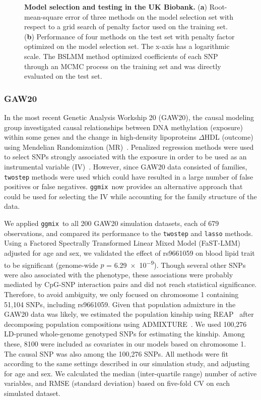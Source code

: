 \documentclass[10pt,letterpaper]{article}
\newcommand{\ggmix}{\texttt{ggmix}}
\begin{document}
\begin{figure}[!h]
	\caption{{\bf Model selection and testing in the UK Biobank.}
	({\bf a}) Root-mean-square error of three methods on the model selection set with respect to a grid search of penalty factor used on the training set. ({\bf b}) Performance of four methods on the test set with penalty factor optimized on the model selection set. The x-axis has a logarithmic scale. The BSLMM method optimized coefficients of each SNP through an MCMC process on the training set and was directly evaluated on the test set.}\label{fig:UKB-Figure}
\end{figure}








\subsubsection*{GAW20}

In the most recent Genetic Analysis Workship 20 (GAW20), the causal modeling group investigated causal relationships between DNA methylation (exposure) within some genes and the change in high-density lipoproteins $\Delta$HDL (outcome) using Mendelian Randomization (MR)~\cite{davey2003mendelian}.
Penalized regression methods were used to select SNPs strongly associated with the exposure in order to be used as an instrumental variable (IV)~\cite{cherlin2018using,zhou2018analysis}.
However, since GAW20 data consisted of families, \texttt{twostep} methods were used which could have resulted in a large number of false positives or false negatives. \ggmix~now provides an alternative approach that could be used for selecting the IV while accounting for the family structure of the data.

We applied \ggmix ~to all 200 GAW20 simulation datasets, each of 679 observations, and compared its performance to the \texttt{twostep} and \texttt{lasso} methods.
Using a Factored Spectrally Transformed Linear Mixed Model (FaST-LMM)~\cite{howey2018application} adjusted for age and sex, we validated the effect of rs9661059 on blood lipid trait to be significant (genome-wide $p$ = \num{6.29e-9}).
Though several other SNPs were also associated with the phenotype, these associations were probably mediated by CpG-SNP interaction pairs and did not reach statistical significance.
Therefore, to avoid ambiguity, we only focused on chromosome 1 containing 51,104 SNPs, including rs9661059.
Given that population admixture in the GAW20 data was likely, we estimated the population kinship using REAP~\cite{thornton2012estimating} after decomposing population compositions using ADMIXTURE~\cite{alexander2009fast}. We used 100,276 LD-pruned whole-genome genotyped SNPs for estimating the kinship. Among these, 8100 were included as covariates in our models based on chromosome 1. The causal SNP was also among the 100,276 SNPs. All methods were fit according to the same settings described in our simulation study, and adjusting for age and sex. We calculated the median (inter-quartile range) number of active variables, and RMSE (standard deviation) based on five-fold CV on each simulated dataset.
\end{document}
